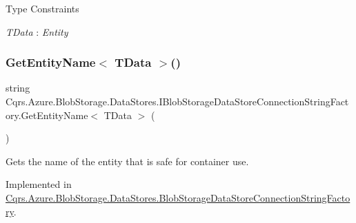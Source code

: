 \begin{Desc}
\item[Type Constraints]\begin{description}
\item[{\em T\+Data} : {\em Entity}]\end{description}
\end{Desc}
\mbox{\label{interfaceCqrs_1_1Azure_1_1BlobStorage_1_1DataStores_1_1IBlobStorageDataStoreConnectionStringFactory_ad7f6480ea3fa6dfab0953f05c2c15f85_ad7f6480ea3fa6dfab0953f05c2c15f85}} 
\subsubsection{\texorpdfstring{Get\+Entity\+Name$<$ T\+Data $>$()}{GetEntityName< TData >()}}
{\footnotesize\ttfamily string Cqrs.\+Azure.\+Blob\+Storage.\+Data\+Stores.\+I\+Blob\+Storage\+Data\+Store\+Connection\+String\+Factory.\+Get\+Entity\+Name$<$ T\+Data $>$ (\begin{DoxyParamCaption}{ }\end{DoxyParamCaption})}



Gets the name of the entity that is safe for container use. 



Implemented in \hyperlink{classCqrs_1_1Azure_1_1BlobStorage_1_1DataStores_1_1BlobStorageDataStoreConnectionStringFactory_a0ece7f48e0305b8397b95308dfdf2532_a0ece7f48e0305b8397b95308dfdf2532}{Cqrs.\+Azure.\+Blob\+Storage.\+Data\+Stores.\+Blob\+Storage\+Data\+Store\+Connection\+String\+Factory}.

